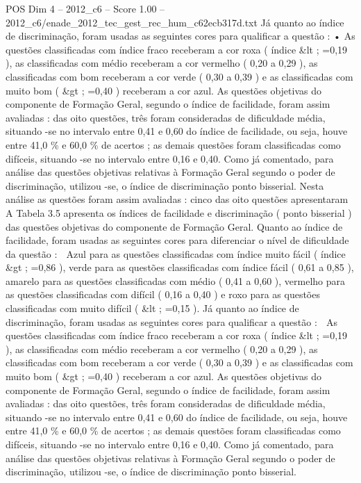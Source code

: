 \begin{textsample}{POS Dim 4 – 2012\_c6 – Score 1.00 – 2012\_c6/enade\_2012\_tec\_gest\_rec\_hum\_c62ecb317d.txt}
Já quanto ao índice de discriminação, foram usadas as seguintes cores para qualificar a questão : • As questões classificadas com índice fraco receberam a cor roxa ( índice \&lt ; =0,19 ), as classificadas com médio receberam a cor vermelho ( 0,20 a 0,29 ), as classificadas com bom receberam a cor verde ( 0,30 a 0,39 ) e as classificadas com muito bom ( \&gt ; =0,40 ) receberam a cor azul.
As questões objetivas do componente de Formação Geral, segundo o índice de facilidade, foram assim avaliadas : das oito questões, três foram consideradas de dificuldade média, situando -se no intervalo entre 0,41 e 0,60 do índice de facilidade, ou seja, houve entre 41,0 \% e 60,0 \% de acertos ; as demais questões foram classificadas como difíceis, situando -se no intervalo entre 0,16 e 0,40.
Como já comentado, para análise das questões objetivas relativas à Formação Geral segundo o poder de discriminação, utilizou -se, o índice de discriminação ponto bisserial.
Nesta análise as questões foram assim avaliadas : cinco das oito questões apresentaram A Tabela 3.5 apresenta os índices de facilidade e discriminação ( ponto bisserial ) das questões objetivas do componente de Formação Geral.
Quanto ao índice de facilidade, foram usadas as seguintes cores para diferenciar o nível de dificuldade da questão :  Azul para as questões classificadas com índice muito fácil ( índice \&gt ; =0,86 ), verde para as questões classificadas com índice fácil ( 0,61 a 0,85 ), amarelo para as questões classificadas com médio ( 0,41 a 0,60 ), vermelho para as questões classificadas com difícil ( 0,16 a 0,40 ) e roxo para as questões classificadas com muito difícil ( \&lt ; =0,15 ).
Já quanto ao índice de discriminação, foram usadas as seguintes cores para qualificar a questão :  As questões classificadas com índice fraco receberam a cor roxa ( índice \&lt ; =0,19 ), as classificadas com médio receberam a cor vermelho ( 0,20 a 0,29 ), as classificadas com bom receberam a cor verde ( 0,30 a 0,39 ) e as classificadas com muito bom ( \&gt ; =0,40 ) receberam a cor azul.
As questões objetivas do componente de Formação Geral, segundo o índice de facilidade, foram assim avaliadas : das oito questões, três foram consideradas de dificuldade média, situando -se no intervalo entre 0,41 e 0,60 do índice de facilidade, ou seja, houve entre 41,0 \% e 60,0 \% de acertos ; as demais questões foram classificadas como difíceis, situando -se no intervalo entre 0,16 e 0,40.
Como já comentado, para análise das questões objetivas relativas à Formação Geral segundo o poder de discriminação, utilizou -se, o índice de discriminação ponto bisserial.

\end{textsample}
